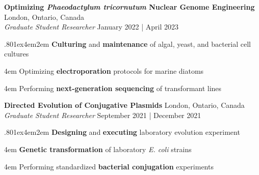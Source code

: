 \documentclass[a4paper,9pt]{extarticle}
\begin{document}
\noindent
\begin{minipage}{1\textwidth}
\setlength{\parindent}{15pt} %
\noindent
	\textbf{Optimizing \textit{Phaeodactylum tricornutum} Nuclear Genome Engineering} \hfill London, Ontario, Canada\\ %
	\textit{Graduate Student Researcher}
	\hfill January 2022 | April 2023 \par %
	{\hsize.80\linewidth\parskip1ex\hangindent4em\parindent2em 
	\setlength{\parskip}{0pt} %
		\textbf{Culturing} and \textbf{maintenance} of algal, yeast, and bacterial cell cultures\par	
		\hangindent4em
		Optimizing \textbf{electroporation} protocols for marine diatoms\par
		\hangindent4em
		Performing \textbf{next-generation sequencing} of transformant lines\par}
\end{minipage}
\vspace{\parskip}

\noindent
\begin{minipage}{1\textwidth}
\setlength{\parindent}{15pt} %
	\noindent
	\textbf{Directed Evolution of Conjugative Plasmids} \hfill London, Ontario, Canada\\ %
	\textit{Graduate Student Researcher}
	\hfill September 2021 | December 2021  \par %
	{\hsize.80\linewidth\parskip1ex\hangindent4em\parindent2em 
	\setlength{\parskip}{0pt} %
		\textbf{Designing} and \textbf{executing} laboratory evolution experiment\par
		\hangindent4em
		\textbf{Genetic transformation} of laboratory \textit{E. coli} strains\par
		\hangindent4em
		Performing standardized \textbf{bacterial conjugation} experiments \par} %
\end{minipage}
\vspace{\parskip}
\end{document}
